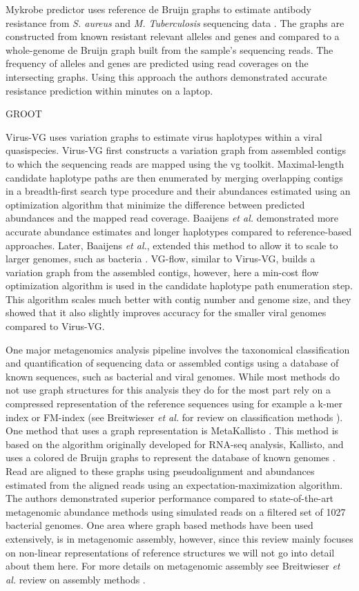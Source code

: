 Mykrobe predictor uses reference de Bruijn graphs to estimate antibody resistance from \textit{S. aureus} and \textit{M. Tuberculosis} sequencing data \cite{Bradley2015-kl}.
The graphs are constructed from known resistant relevant alleles and genes and compared to a whole-genome de Bruijn graph built from the sample's sequencing reads.
The frequency of alleles and genes are predicted using read coverages on the intersecting graphs.
Using this approach the authors demonstrated accurate resistance prediction within minutes on a laptop.  

GROOT \cite{Rowe2018-bg}

Virus-VG uses variation graphs to estimate virus haplotypes within a viral quasispecies.
Virus-VG first constructs a variation graph from assembled contigs to which the sequencing reads are mapped using the vg toolkit.
Maximal-length candidate haplotype paths are then enumerated by merging overlapping contigs in a breadth-first search type procedure and their abundances estimated using an optimization algorithm that minimize the difference between predicted abundances and the mapped read coverage. 
Baaijens \textit{et al.} demonstrated more accurate abundance estimates and longer haplotypes compared to reference-based approaches.
Later, Baaijens \textit{et al.}, extended this method to allow it to scale to larger genomes, such as bacteria \cite{Baaijens2019-ha}.
VG-flow, similar to Virus-VG, builds a variation graph from the assembled contigs, however, here a min-cost flow optimization algorithm is used in the candidate haplotype path enumeration step.
This algorithm scales much better with contig number and genome size, and they showed that it also slightly improves accuracy for the smaller viral genomes compared to Virus-VG. 

One major metagenomics analysis pipeline involves the taxonomical classification and quantification of sequencing data or assembled contigs using a database of known sequences, such as bacterial and viral genomes. 
While most methods do not use graph structures for this analysis they do for the most part rely on a compressed representation of the reference sequences using for example a k-mer index or FM-index (see Breitwieser \textit{et al.} for review on classification methods \cite{Breitwieser2017-yp}). 
One method that uses a graph representation is MetaKallisto \cite{Schaeffer2017-fh}. 
This method is based on the algorithm originally developed for RNA-seq analysis, Kallisto, and uses a colored de Bruijn graphs to represent the database of known genomes \cite{Bray_2016}. 
Read are aligned to these graphs using pseudoalignment and abundances estimated from the aligned reads using an expectation-maximization algorithm. 
The authors demonstrated superior performance compared to state-of-the-art metagenomic abundance methods using simulated reads on a filtered set of 1027 bacterial genomes.
One area where graph based methods have been used extensively, is in metagenomic assembly, however, since this review mainly focuses on non-linear representations of reference structures we will not go into detail about them here. 
For more details on metagenomic assembly see Breitwieser \textit{et al.} review on assembly methods \cite{Breitwieser2017-yp}. 
